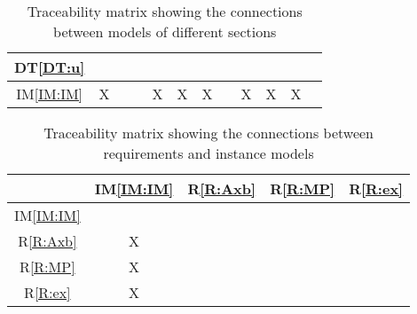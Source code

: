 \documentclass[12pt]{article}
\newcommand{\dtref}[1]{DT\ref{#1}}
\newcommand{\iref}[1]{IM\ref{#1}}
\newcommand{\rref}[1]{R\ref{#1}}
\begin{document}
\begin{table}[H]
\begin{tabular}{|c|c|c|c|c|c|c|c|c|c|c|c|}
    \dtref{DT:u}        &               &                  &                   &              &                 &                &                   &                     &                  &              &              \\ \hline
    \iref{IM:IM}        & X             &                  &                   & X            & X               & X              &                   & X                   & X                & X            &              \\ \hline
  \end{tabular}
  \caption{Traceability matrix showing the connections between models of different sections}
  \label{Table:trace}
\end{table}

\begin{table}[H]
\centering
\begin{tabular}{|c|c|c|c|c|} \hline
             & \iref{IM:IM} & \rref{R:Axb} & \rref{R:MP} & \rref{R:ex} \\ \hline
\iref{IM:IM} &              &              &             &             \\ \hline
\rref{R:Axb} & X            &              &             &             \\ \hline
\rref{R:MP}  & X            &              &             &             \\ \hline
\rref{R:ex}  & X            &              &             &             \\ \hline
\end{tabular}
\caption{Traceability matrix showing the connections between requirements and instance models}
\label{Table:R_trace}
\end{table}


\end{document}
